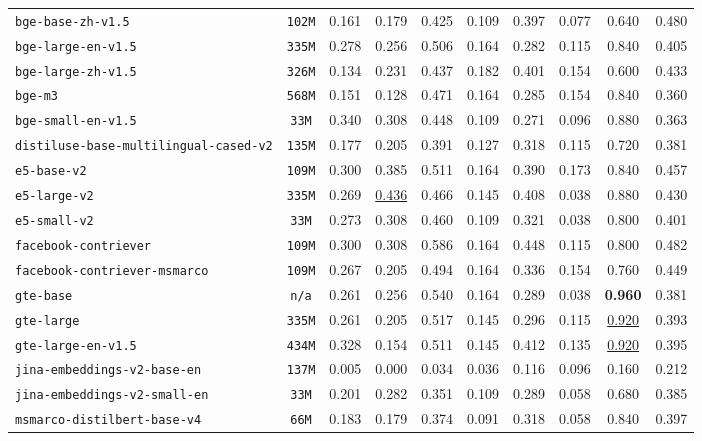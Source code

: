 \documentclass[11pt]{article}
\begin{document}
\begin{table}[htbp]
{\begin{tabular}{lccccccccc}
\texttt{bge-base-zh-v1.5} & \texttt{102M} & 0.161 & 0.179 & 0.425 & 0.109 & 0.397 & 0.077 & 0.640 & 0.480 \\
\texttt{bge-large-en-v1.5} & \texttt{335M} & 0.278 & 0.256 & 0.506 & 0.164 & 0.282 & 0.115 & 0.840 & 0.405 \\
\texttt{bge-large-zh-v1.5} & \texttt{326M} & 0.134 & 0.231 & 0.437 & 0.182 & 0.401 & 0.154 & 0.600 & 0.433 \\
\texttt{bge-m3} & \texttt{568M} & 0.151 & 0.128 & 0.471 & 0.164 & 0.285 & 0.154 & 0.840 & 0.360 \\
\texttt{bge-small-en-v1.5} & \texttt{33M} & 0.340 & 0.308 & 0.448 & 0.109 & 0.271 & 0.096 & 0.880 & 0.363 \\
\texttt{distiluse-base-multilingual-cased-v2} & \texttt{135M} & 0.177 & 0.205 & 0.391 & 0.127 & 0.318 & 0.115 & 0.720 & 0.381 \\
\texttt{e5-base-v2} & \texttt{109M} & 0.300 & 0.385 & 0.511 & 0.164 & 0.390 & 0.173 & 0.840 & 0.457 \\
\texttt{e5-large-v2} & \texttt{335M} & 0.269 & \underline{0.436} & 0.466 & 0.145 & 0.408 & 0.038 & 0.880 & 0.430 \\
\texttt{e5-small-v2} & \texttt{33M} & 0.273 & 0.308 & 0.460 & 0.109 & 0.321 & 0.038 & 0.800 & 0.401 \\
\texttt{facebook-contriever} & \texttt{109M} & 0.300 & 0.308 & 0.586 & 0.164 & 0.448 & 0.115 & 0.800 & 0.482 \\
\texttt{facebook-contriever-msmarco} & \texttt{109M} & 0.267 & 0.205 & 0.494 & 0.164 & 0.336 & 0.154 & 0.760 & 0.449 \\
\texttt{gte-base} & \texttt{n/a} & 0.261 & 0.256 & 0.540 & 0.164 & 0.289 & 0.038 & \textbf{0.960} & 0.381 \\
\texttt{gte-large} & \texttt{335M} & 0.261 & 0.205 & 0.517 & 0.145 & 0.296 & 0.115 & \underline{0.920} & 0.393 \\
\texttt{gte-large-en-v1.5} & \texttt{434M} & 0.328 & 0.154 & 0.511 & 0.145 & 0.412 & 0.135 & \underline{0.920} & 0.395 \\
\texttt{jina-embeddings-v2-base-en} & \texttt{137M} & 0.005 & 0.000 & 0.034 & 0.036 & 0.116 & 0.096 & 0.160 & 0.212 \\
\texttt{jina-embeddings-v2-small-en} & \texttt{33M} & 0.201 & 0.282 & 0.351 & 0.109 & 0.289 & 0.058 & 0.680 & 0.385 \\
\texttt{msmarco-distilbert-base-v4} & \texttt{66M} & 0.183 & 0.179 & 0.374 & 0.091 & 0.318 & 0.058 & 0.840 & 0.397 \\

\end{tabular}}
\end{table}
\end{document}

